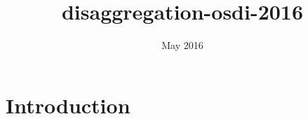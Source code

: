 \documentclass{article}
\title{disaggregation-osdi-2016}
\author{ }
\date{May 2016}
\begin{document}
\maketitle

\section{Introduction}
\end{document}
